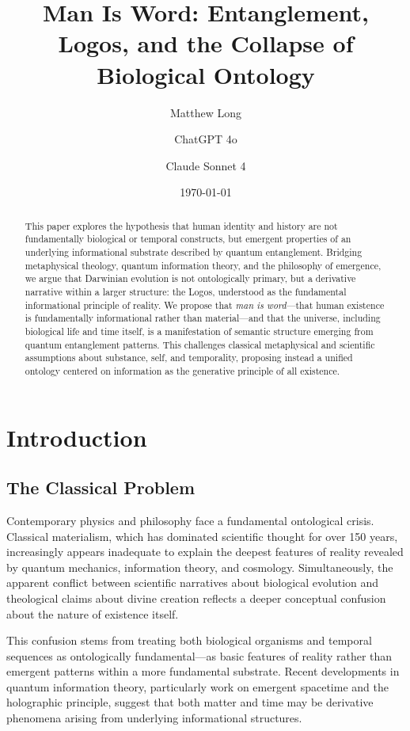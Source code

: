 \documentclass[12pt]{article}
\title{Man Is Word: Entanglement, Logos, and the Collapse of Biological Ontology}
\author[1]{Matthew Long}
\author[2]{ChatGPT 4o}
\author[3]{Claude Sonnet 4}
\affil[1]{Yoneda AI}
\affil[2]{OpenAI}
\affil[3]{Anthropic}
\date{\today}
\begin{document}
\maketitle

\begin{abstract}
This paper explores the hypothesis that human identity and history are not fundamentally biological or temporal constructs, but emergent properties of an underlying informational substrate described by quantum entanglement. Bridging metaphysical theology, quantum information theory, and the philosophy of emergence, we argue that Darwinian evolution is not ontologically primary, but a derivative narrative within a larger structure: the Logos, understood as the fundamental informational principle of reality. We propose that \emph{man is word}—that human existence is fundamentally informational rather than material—and that the universe, including biological life and time itself, is a manifestation of semantic structure emerging from quantum entanglement patterns. This challenges classical metaphysical and scientific assumptions about substance, self, and temporality, proposing instead a unified ontology centered on information as the generative principle of all existence.
\end{abstract}

\onehalfspacing

\tableofcontents

\newpage

\section{Introduction}

\subsection{The Classical Problem}

Contemporary physics and philosophy face a fundamental ontological crisis. Classical materialism, which has dominated scientific thought for over 150 years, increasingly appears inadequate to explain the deepest features of reality revealed by quantum mechanics, information theory, and cosmology. Simultaneously, the apparent conflict between scientific narratives about biological evolution and theological claims about divine creation reflects a deeper conceptual confusion about the nature of existence itself.

This confusion stems from treating both biological organisms and temporal sequences as ontologically fundamental—as basic features of reality rather than emergent patterns within a more fundamental substrate. Recent developments in quantum information theory, particularly work on emergent spacetime and the holographic principle, suggest that both matter and time may be derivative phenomena arising from underlying informational structures.
\end{document}
